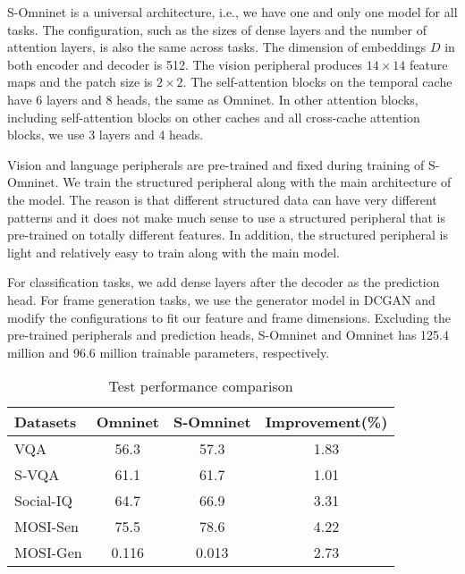 \documentclass{article}
\begin{document}
S-Omninet is a universal architecture, i.e., we have one and only one model for all tasks. The configuration, such as the sizes of dense layers and the number of attention layers, is also the same across tasks. The dimension of embeddings $D$ in both encoder and decoder is 512. The vision peripheral produces $14 \times 14$ feature maps and the patch size is $2 \times 2$. The self-attention blocks on the temporal cache have 6 layers and 8 heads, the same as Omninet. In other attention blocks, including self-attention blocks on other caches and all cross-cache attention blocks, we use 3 layers and 4 heads. 

Vision and language peripherals are pre-trained and fixed during training of S-Omninet. We train the structured peripheral along with the main architecture of the model. The reason is that different structured data can have very different patterns and it does not make much sense to use a structured peripheral that is pre-trained on totally different features. In addition, the structured peripheral is light and relatively easy to train along with the main model.

For classification tasks, we add dense layers after the decoder as the prediction head. For frame generation tasks, we use the generator model in DCGAN \cite{radford2015unsupervised} and modify the configurations to fit our feature and frame dimensions. Excluding the pre-trained peripherals and prediction heads, S-Omninet and Omninet has 125.4 million and 96.6 million trainable parameters, respectively.





\begin{table}
  \caption{Test performance comparison}
  \centering
  \label{tab:results}
  \begin{tabular}{@{}lS[table-format=2.3]S[table-format=2.2]c@{}}
    \toprule
    Datasets&{Omninet}&{S-Omninet}&Improvement(\%)\\
    \midrule
    VQA & 56.3 & 57.3 & 1.83\\
    S-VQA & 61.1 & 61.7 & 1.01 \\
    Social-IQ & 64.7 & 66.9 & 3.31 \\
    MOSI-Sen & 75.5 & 78.6 & 4.22 \\
    MOSI-Gen & 0.116 & 0.013 & 2.73 \\
  \bottomrule
\end{tabular}
\end{table}
\end{document}
